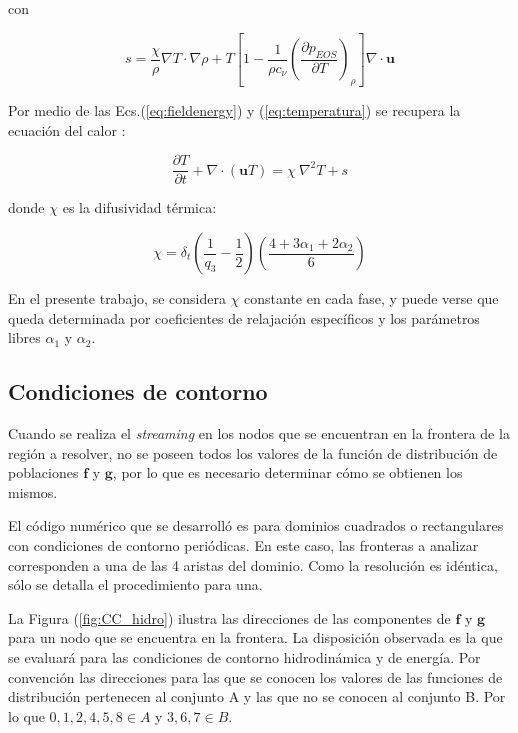 con 

\begin{equation}
    s = \frac{\chi}{\rho} \nabla T \cdot \nabla \rho + T \left[ 1 - \frac{1}{\rho c_{\nu}} {\left( \frac{\partial p_{EOS}}{\partial T} \right)}_{\rho} \right] \nabla \cdot \mathbf{u}
    \label{eq:s_chica}
\end{equation}

Por medio de las  Ecs.(\ref{eq:fieldenergy}) y (\ref{eq:temperatura}) se recupera la ecuación del calor \cite{markus2011simulation}:

\begin{equation}
    \frac{\partial T}{\partial t} + \nabla \cdot ( \mathbf{u} T ) = \chi \> {\nabla }^{2} T + s
    \label{eq:calor_ecu}
\end{equation}

donde $\chi$ es la difusividad térmica:

\begin{equation}
\chi = \delta_{t} \left( \frac{1}{q_{3}} - \frac{1}{2} \right) \left( \frac{ 4 + 3 \alpha_{1} + 2 \alpha_{2}}{6} \right)
\label{eq:chi}
\end{equation}

En el presente trabajo, se considera $\chi$ constante en cada fase, y puede verse que queda determinada por coeficientes de relajación específicos y los parámetros libres $\alpha_{1}$ y $\alpha_{2}$.


\subsection{Condiciones de contorno}

Cuando se realiza el \textit{streaming} en los nodos que se encuentran en la frontera de la región a resolver, no se poseen todos los valores de la función de distribución de poblaciones $\mathbf{f}$ y $\mathbf{g}$, por lo que es necesario determinar cómo se obtienen los mismos. 

El código numérico que se desarrolló es para dominios cuadrados o rectangulares con condiciones de contorno periódicas. En este caso, las fronteras a analizar corresponden a una de las 4 aristas del dominio. Como la resolución es idéntica, sólo se detalla el procedimiento para una.

La Figura (\ref{fig:CC_hidro}) ilustra las direcciones de las componentes de $\mathbf{f}$ y $\mathbf{g}$ para un nodo que se encuentra en la frontera. La disposición observada es la que se evaluará para las condiciones de contorno hidrodinámica y de energía.  Por convención las direcciones para las que se conocen los valores de las funciones de distribución pertenecen al conjunto A y las que no se conocen al conjunto B. Por lo que $ 0, 1, 2, 4, 5, 8 \in A$ y $ 3, 6, 7 \in B$. 

